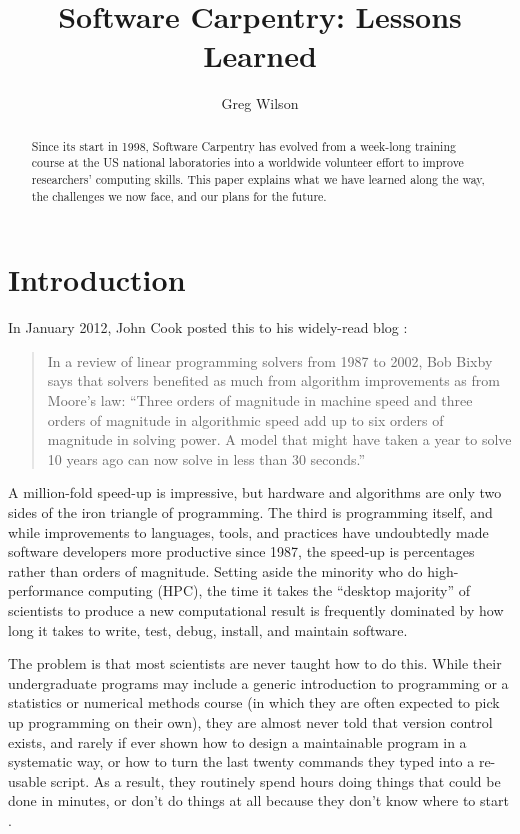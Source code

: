 \documentclass[10pt,a4paper,twocolumn]{article}
\begin{document}
\title{Software Carpentry: Lessons Learned}
\author[1]{Greg Wilson}

\maketitle
\thispagestyle{fancy}

\begin{abstract}

Since its start in 1998, Software Carpentry has evolved from a
week-long training course at the US national laboratories into a
worldwide volunteer effort to improve researchers' computing
skills. This paper explains what we have learned along the way, the
challenges we now face, and our plans for the future.

\end{abstract}
\clearpage

\section*{Introduction}

In January 2012, John Cook posted this to his widely-read blog
\cite{cook2012}:

\begin{quote}
In a review of linear programming solvers from 1987 to 2002, Bob Bixby
says that solvers benefited as much from algorithm improvements as from
Moore's law: ``Three orders of magnitude in machine speed and three
orders of magnitude in algorithmic speed add up to six orders of
magnitude in solving power. A model that might have taken a year to
solve 10 years ago can now solve in less than 30 seconds.''
\end{quote}

A million-fold speed-up is impressive, but hardware and algorithms are
only two sides of the iron triangle of programming. The third is
programming itself, and while improvements to languages, tools, and
practices have undoubtedly made software developers more productive
since 1987, the speed-up is percentages rather than orders of magnitude.
Setting aside the minority who do high-performance computing (HPC), the
time it takes the ``desktop majority'' of scientists to produce a new
computational result is frequently dominated by how long it takes to
write, test, debug, install, and maintain software.

The problem is that most scientists are never taught how to do this. While
their undergraduate programs may include a generic introduction to
programming or a statistics or numerical methods course (in which
they are often expected to pick up programming on their own), they are
almost never told that version control exists, and rarely if ever shown
how to design a maintainable program in a systematic way, or how to turn
the last twenty commands they typed into a re-usable script. As a
result, they routinely spend hours doing things that could be done in
minutes, or don't do things at all because they don't know where to
start \cite{hannay2009,prabhu2011}.
\end{document}
